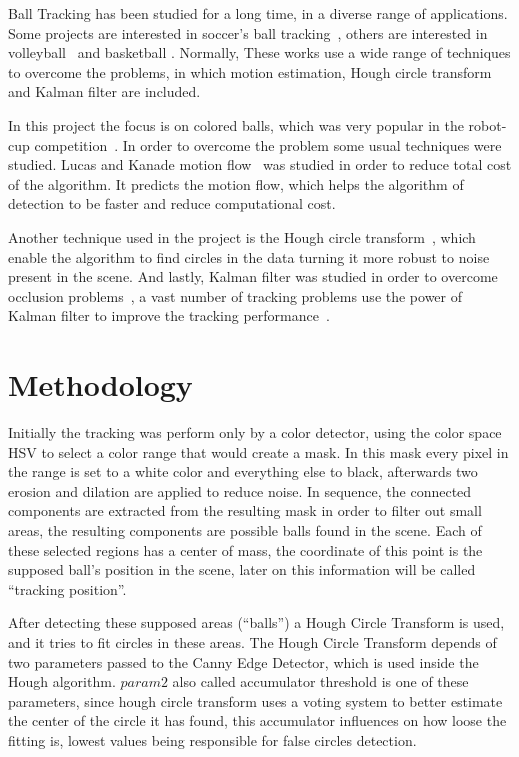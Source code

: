 \documentclass[10pt,twocolumn,letterpaper]{article}
\begin{document}
Ball Tracking has been studied for a long time, in a diverse range of applications.  Some projects  are interested in soccer's ball tracking~\cite{seo1997ball,  tong2004effective, choi2004probabilistic}, others are interested in  volleyball~\cite{chen2007physics} and basketball \cite{ maksai2016players}.   Normally, These works use a wide range of techniques to overcome the problems,  in which motion estimation, Hough circle transform and Kalman filter are included.

In this project the focus is on colored balls, which was very popular in the robot-cup competition~\cite{kitano1997robocup, simon2000robust, kitano1998robocup}.  In order to overcome the problem some usual techniques were studied. Lucas and Kanade motion flow~\cite{tomasi1992shape, tomasi1991detection} was studied in order to reduce total cost of the algorithm.  It predicts the motion flow, which helps the algorithm of detection to be faster and reduce computational cost.

Another technique used in the project is the Hough circle
transform~\cite{illingworth1987adaptive}, which enable  the algorithm to find
circles in the data turning it more robust to noise present in the scene. And
lastly, Kalman filter was studied in order to overcome occlusion problems~\cite{ristic2004beyond}, a vast number of tracking problems use the power of Kalman filter to improve the tracking performance~\cite{satoh2004color}.


\section{Methodology}\label{sec:method}

Initially the tracking was perform only by a color detector, using the color space HSV to select a color range that would create a mask. In this mask every pixel in the range is set to a white color and everything else to black, afterwards two erosion and dilation are applied to reduce noise. In sequence, the connected components are extracted from the resulting mask in order to filter out small areas, the resulting components are possible balls found in the scene. Each of these selected regions has a center of mass, the coordinate of this point is the supposed ball's position in the scene, later on this information will be called ``tracking position''.

After detecting these supposed areas (``balls'') a Hough Circle Transform  is
used, and it tries to fit circles in these areas. The Hough Circle Transform
depends of two parameters passed to the Canny Edge Detector, which is used
inside the Hough algorithm. $param2$ also called accumulator threshold is one of
these parameters, since hough circle transform uses a voting system to better
estimate the center of the circle it has found, this accumulator influences on
how loose the fitting is, lowest values being responsible for false circles
detection.
\end{document}

